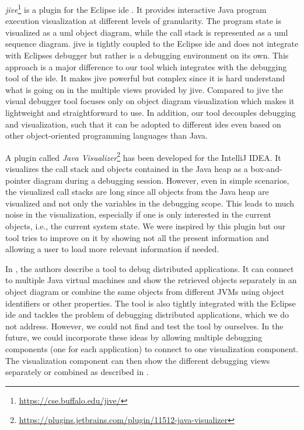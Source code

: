 \documentclass[conference]{IEEEtran}
\newcommand{\intellij}{IntelliJ IDEA}
\begin{document}
\textit{\gls*{jive}}\footnote{\url{https://cse.buffalo.edu/jive/}} is a plugin for the Eclipse \gls*{ide} \cite{czyzDeclarativeVisualDebugging2007,k.p.FiniteStateModel2021}.
It provides interactive Java program execution visualization at different levels of granularity.
The program state is visualized as a \gls*{uml} object diagram, while the call stack is represented as a \gls*{uml} sequence diagram.
\gls*{jive} is tightly coupled to the Eclipse \gls*{ide} and does not integrate with Eclipses debugger but rather is a debugging environment on its own.
This approach is a major difference to our tool which integrates with the debugging tool of the \gls*{ide}.
It makes \gls*{jive} powerful but complex since it is hard understand what is going on in the multiple views provided by \gls*{jive}.
Compared to \gls*{jive} the visual debugger tool focuses only on object diagram visualization which makes it lightweight and straightforward to use.
In addition, our tool decouples debugging and visualization, such that it can be adopted to different \glspl*{ide} even based on other object-oriented programming languages than Java.

A plugin called \textit{Java Visualizer}\footnote{\url{https://plugins.jetbrains.com/plugin/11512-java-visualizer}} has been developed for the \intellij{}.
It visualizes the call stack and objects contained in the Java heap as a box-and-pointer diagram during a debugging session.
However, even in simple scenarios, the visualized call stacks are long since all objects from the Java heap are visualized and not only the variables in the debugging scope.
This leads to much noise in the visualization, especially if one is only interested in the current objects, i.e., the current system state.
We were inspired by this plugin but our tool tries to improve on it by showing not all the present information and allowing a user to load more relevant information if needed.

In \cite{kochGraphicalDebuggingDistributed2015}, the authors describe a tool to debug distributed applications.
It can connect to multiple Java virtual machines and show the retrieved objects separately in an object diagram or combine the same objects from different JVMs using object identifiers or other properties.
The tool is also tightly integrated with the Eclipse \gls*{ide} and tackles the problem of debugging distributed applications, which we do not address.
However, we could not find and test the tool by ourselves.
In the future, we could incorporate these ideas by allowing multiple debugging components (one for each application) to connect to one visualization component.
The visualization component can then show the different debugging views separately or combined as described in \cite{kochGraphicalDebuggingDistributed2015}.
\end{document}
